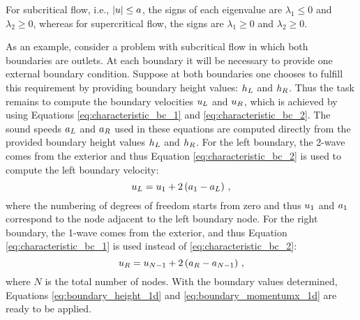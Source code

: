 For subcritical flow, i.e., $|u|\leq a$,
the signs of each eigenvalue are $\lambda_1\leq 0$ and $\lambda_2\geq 0$,
whereas for supercritical flow, the signs are $\lambda_1\geq 0$
and $\lambda_2\geq 0$.

As an example, consider a problem with subcritical flow in which both
boundaries are outlets. At each boundary it will be necessary to provide one
external boundary condition. Suppose at both boundaries one chooses to fulfill
this requirement by providing boundary height values: $h_L$ and $h_R$.
Thus the task remains to compute the boundary velocities
$u_L$ and $u_R$, which is achieved by using Equations
\eqref{eq:characteristic_bc_1} and \eqref{eq:characteristic_bc_2}.
The sound speeds $a_L$ and $a_R$ used in these
equations are computed directly from the provided boundary height values
$h_L$ and $h_R$.
For the left boundary, the 2-wave comes from the exterior and thus Equation
\eqref{eq:characteristic_bc_2} is used to compute the left boundary
velocity:
\begin{equation}
  u_L
  = u_1 + 2\left(a_1 - a_L\right) \,,
\end{equation}
where the numbering of degrees of freedom starts from zero and
thus $u_1$ and $a_1$ correspond to the node
adjacent to the left boundary node.
For the right boundary, the 1-wave comes from the exterior, and
thus Equation \eqref{eq:characteristic_bc_1} is used instead of
\eqref{eq:characteristic_bc_2}:
\begin{equation}
  u_R
  = u_{N-1} + 2\left(a_R - a_{N-1}\right) \,,
\end{equation}
where $N$ is the total number of nodes.
With the boundary values determined, Equations \eqref{eq:boundary_height_1d}
and \eqref{eq:boundary_momentumx_1d} are ready to be applied.
